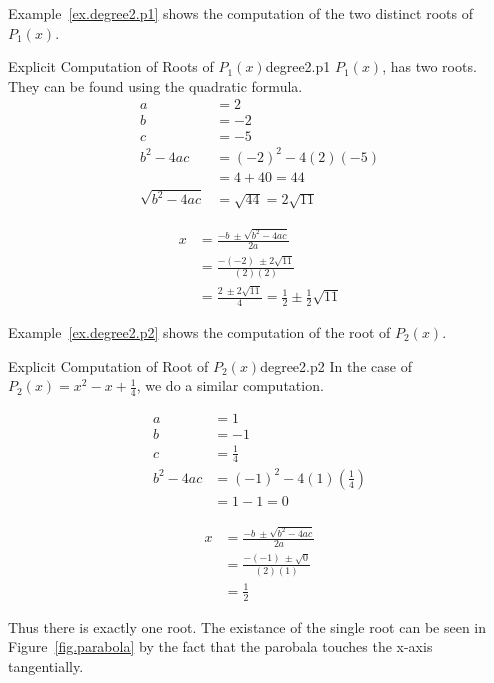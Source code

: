 Example~\ref{ex.degree2.p1} shows the computation of the two distinct roots of $P_1(x)$.

\begin{example}{Explicit Computation of Roots of $P_1(x)$}{degree2.p1}
  $P_1(x)$, has two roots.  They can be found using the quadratic formula.
  \begin{align*}
    a&=2\\
    b&=-2\\
    c&=-5\\
    b^2 - 4a c &= (-2)^2 - 4 (2) (-5)\\
    &= 4 + 40 = 44\\
    \sqrt{b^2 - 4a c} &= \sqrt{44} = 2\sqrt{11}
  \end{align*}

\begin{align}
  x &= \frac{-b~ \pm \sqrt{b^2 - 4a c}}{2a}\label{eq.quad.formula}\\
  &= \frac{-(-2)~ \pm 2\sqrt{11}}{(2)(2)}\nonumber\\
  &= \frac{2 ~\pm 2\sqrt{11}}{4}
  = \frac{1}{2} \pm \frac{1}{2}\sqrt{11}\nonumber
\end{align}
  
\end{example}

Example~\ref{ex.degree2.p2} shows the computation of the root of $P_2(x)$.

\begin{example}{Explicit Computation of Root of $P_2(x)$}{degree2.p2}
In the case of $P_2(x) = x^2 -x + \frac{1}{4}$, we do a similar computation.

\begin{align*}
  a &= 1\\
  b &= -1\\
  c &= \frac{1}{4} \\
  b^2 - 4a c &= (-1)^2 - 4 (1) (\frac{1}{4})\\
  &= 1 - 1 = 0
\end{align*}

\begin{align*}
  x &= \frac{-b~ \pm \sqrt{b^2 - 4a c}}{2a}\\
  &= \frac{-(-1)~ \pm \sqrt{0}}{(2)(1)}\\
  &= \frac{1}{2}
\end{align*}


Thus there is exactly one root.  The existance of the single root can be
seen in Figure~\ref{fig.parabola} by the fact that the
parobala touches the x-axis tangentially.
\end{example}

